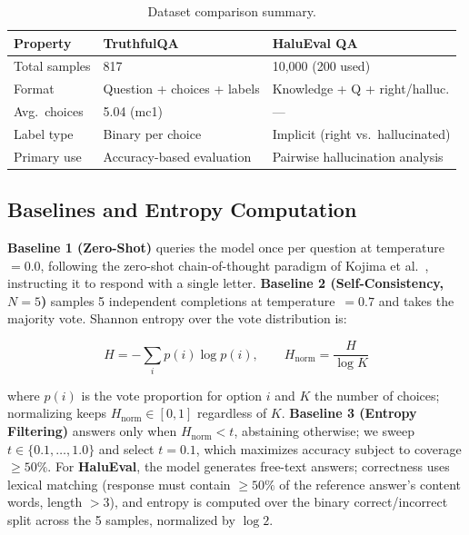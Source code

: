 \documentclass{llncs}
\begin{document}
\begin{table}[h]
\centering
\caption{Dataset comparison summary.}
\label{tab:datasets}
\begin{tabular}{lll}
\toprule
\textbf{Property}  & \textbf{TruthfulQA}               & \textbf{HaluEval QA}              \\
\midrule
Total samples      & 817                               & 10{,}000 (200 used)               \\
Format             & Question + choices + labels       & Knowledge + Q + right/halluc.     \\
Avg.\ choices      & 5.04 (mc1)                        & —                                 \\
Label type         & Binary per choice                 & Implicit (right vs.\ hallucinated)\\
Primary use        & Accuracy-based evaluation         & Pairwise hallucination analysis   \\
\bottomrule
\end{tabular}
\end{table}

\subsection{Baselines and Entropy Computation}

\textbf{Baseline 1 (Zero-Shot)} queries the model once per question at
temperature~$=0.0$, following the zero-shot chain-of-thought paradigm of
Kojima et al.~\cite{kojima2022large}, instructing it to respond with a single
letter. \textbf{Baseline 2 (Self-Consistency, $N{=}5$)} samples 5 independent
completions at temperature~$=0.7$ and takes the majority vote. Shannon entropy
over the vote distribution is:

\begin{equation}
  H = -\sum_{i} p(i) \log p(i), \qquad
  H_{\text{norm}} = \frac{H}{\log K}
  \label{eq:entropy}
\end{equation}

\noindent where $p(i)$ is the vote proportion for option $i$ and $K$ the
number of choices; normalizing keeps $H_{\text{norm}} \in [0,1]$ regardless of
$K$. \textbf{Baseline 3 (Entropy Filtering)} answers only when
$H_{\text{norm}} < t$, abstaining otherwise; we sweep $t \in \{0.1,\ldots,1.0\}$
and select $t{=}0.1$, which maximizes accuracy subject to coverage
$\geq 50\%$. For \textbf{HaluEval}, the model generates free-text answers;
correctness uses lexical matching (response must contain $\geq 50\%$ of the
reference answer's content words, length $>3$), and entropy is computed over
the binary correct/incorrect split across the 5 samples, normalized by
$\log 2$.
\end{document}
